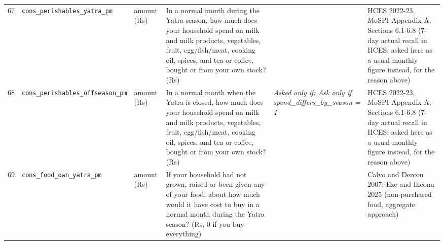 \documentclass[9pt,a4paper,landscape]{article}
\begin{document}
\begin{longtable}{@{}p{0.5cm}p{3.3cm}p{1.7cm}p{7.3cm}p{5.6cm}p{5.4cm}@{}}
\footnotesize 67 & \footnotesize\texttt{cons\_perishables\_yatra\_pm} & \scriptsize amount (Rs) & \footnotesize In a normal month during the Yatra season, how much does your household spend on milk and milk products, vegetables, fruit, egg/fish/meat, cooking oil, spices, and tea or coffee, bought or from your own stock? (Rs)\par\vspace{1pt}{\footnotesize\color{hdr}{\hifont यात्रा के मौसम के आम महीने में, आप (और जो यहाँ आपके साथ रहते हैं) दूध और दूध की चीज़ें, सब्ज़ी, फल, अंडा/मछली/मांस, तेल, मसाले, और चाय पर कितना ख़र्च करते हैं? (रुपये)}} & \scriptsize  & \scriptsize HCES 2022-23, MoSPI Appendix A, Sections 6.1-6.8 (7-day actual recall in HCES; asked here as a usual monthly figure instead, for the reason above)\\
\footnotesize 68 & \footnotesize\texttt{cons\_perishables\_offseason\_pm} & \scriptsize amount (Rs) & \footnotesize In a normal month when the Yatra is closed, how much does your household spend on milk and milk products, vegetables, fruit, egg/fish/meat, cooking oil, spices, and tea or coffee, bought or from your own stock? (Rs)\par\vspace{1pt}{\footnotesize\color{hdr}{\hifont जब यात्रा बंद रहती है, उस आम महीने में आपका घर दूध और दूध की चीज़ें, सब्ज़ी, फल, अंडा/मछली/मांस, तेल, मसाले, और चाय पर कितना ख़र्च करता है? (रुपये)}} & \scriptsize \textit{Asked only if: Ask only if spend\_differs\_by\_season = 1} & \scriptsize HCES 2022-23, MoSPI Appendix A, Sections 6.1-6.8 (7-day actual recall in HCES; asked here as a usual monthly figure instead, for the reason above)\\
\footnotesize 69 & \footnotesize\texttt{cons\_food\_own\_yatra\_pm} & \scriptsize amount (Rs) & \footnotesize If your household had not grown, raised or been given any of your food, about how much would it have cost to buy in a normal month during the Yatra season? (Rs, 0 if you buy everything)\par\vspace{1pt}{\footnotesize\color{hdr}{\hifont अगर आप (और जो यहाँ आपके साथ रहते हैं) अपना खाना ख़ुद न उगाते, न पालते और न किसी से मिलता, तो यात्रा के मौसम के आम महीने में उसे ख़रीदने में लगभग कितना लगता? (रुपये, सब ख़रीदते हों तो 0)}} & \scriptsize  & \scriptsize Calvo and Dercon 2007; Eze and Iheonu 2025 (non-purchased food, aggregate approach)\\

\end{longtable}
\end{document}
